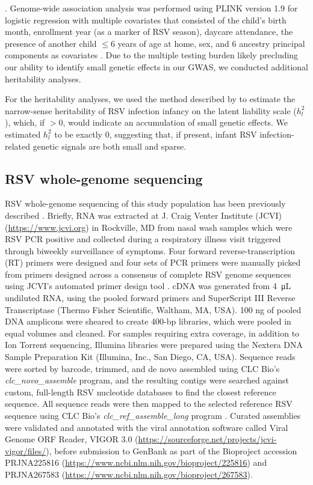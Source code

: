 \documentclass{article} %
\begin{document}
\citep{yang2011gcta}.
Genome-wide association analysis was performed using PLINK version 1.9 for logistic regression with multiple covariates that consisted of the child's birth month, enrollment year (as a marker of RSV season), daycare attendance, the presence of another child $\le 6$ years of age at home, sex, and 6 ancestry principal components as covariates
\citep{purcell2007plink}.
Due to the multiple testing burden likely precluding our ability to identify small genetic effects in our GWAS, we conducted additional heritability analyses.

For the heritability analyses, we used the method described by \citet{golan2014measuring} to estimate the narrow-sense heritability of RSV infection infancy on the latent liability scale ($h_l^2$), which, if  $> 0$, would indicate an accumulation of small genetic effects.
We estimated $h_l^2$ to be exactly 0, suggesting that, if present, infant RSV infection-related genetic signals are both small and sparse. 

\subsection{RSV whole-genome sequencing}
RSV whole-genome sequencing of this study population has been previously described 
\citep{schobel_respiratory_2016}.
Briefly, RNA was extracted at J. Craig Venter Institute (JCVI) (\url{https://www.jcvi.org}) in Rockville, MD from nasal wash samples which were RSV PCR positive and collected during a respiratory illness visit triggered through biweekly surveillance of symptoms. 
Four forward reverse-transcription (RT) primers were designed and four sets of PCR primers were manually picked from primers designed across a consensus of complete RSV genome sequences using JCVI’s automated primer design tool
\citep{li_automated_2012}.
cDNA was generated from \SI{4}{\micro\liter}  undiluted RNA, using the pooled forward primers and SuperScript III Reverse Transcriptase (Thermo Fisher Scientific, Waltham, MA, USA). 
100 ng of pooled DNA amplicons were sheared to create 400-bp libraries, which were pooled in equal volumes and cleaned. 
For samples requiring extra coverage, in addition to Ion Torrent sequencing, Illumina libraries were prepared using the Nextera DNA Sample Preparation Kit (Illumina, Inc., San Diego, CA, USA). 
Sequence reads were sorted by barcode, trimmed, and de novo assembled using CLC Bio's \textit{clc\_novo\_assemble} program, and the resulting contigs were searched against custom, full-length RSV nucleotide databases to find the closest reference sequence. 
All sequence reads were then mapped to the selected reference RSV sequence using CLC Bio's \textit{clc\_ref\_assemble\_long} program 
\citep{bioWhite2016}.
Curated assemblies were validated and annotated with the viral annotation software called Viral Genome ORF Reader, VIGOR 3.0 (\url{https://sourceforge.net/projects/jcvi-vigor/files/}), before submission to GenBank as part of the Bioproject accession PRJNA225816 (\url{https://www.ncbi.nlm.nih.gov/bioproject/225816})
\citep{wang_vigor_2012} 
and PRJNA267583 (\url{https://www.ncbi.nlm.nih.gov/bioproject/267583}).
\end{document}
